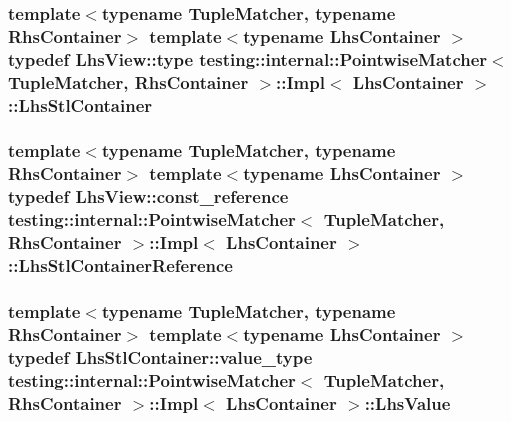 \subsubsection[{\texorpdfstring{Lhs\+Stl\+Container}{LhsStlContainer}}]{\setlength{\rightskip}{0pt plus 5cm}template$<$typename Tuple\+Matcher, typename Rhs\+Container$>$ template$<$typename Lhs\+Container $>$ typedef {\bf Lhs\+View\+::type} {\bf testing\+::internal\+::\+Pointwise\+Matcher}$<$ Tuple\+Matcher, Rhs\+Container $>$\+::{\bf Impl}$<$ Lhs\+Container $>$\+::{\bf Lhs\+Stl\+Container}}\hypertarget{classtesting_1_1internal_1_1PointwiseMatcher_1_1Impl_a23420b57b4cd6d83cec8afda746c27f2}{}\label{classtesting_1_1internal_1_1PointwiseMatcher_1_1Impl_a23420b57b4cd6d83cec8afda746c27f2}
\subsubsection[{\texorpdfstring{Lhs\+Stl\+Container\+Reference}{LhsStlContainerReference}}]{\setlength{\rightskip}{0pt plus 5cm}template$<$typename Tuple\+Matcher, typename Rhs\+Container$>$ template$<$typename Lhs\+Container $>$ typedef {\bf Lhs\+View\+::const\+\_\+reference} {\bf testing\+::internal\+::\+Pointwise\+Matcher}$<$ Tuple\+Matcher, Rhs\+Container $>$\+::{\bf Impl}$<$ Lhs\+Container $>$\+::{\bf Lhs\+Stl\+Container\+Reference}}\hypertarget{classtesting_1_1internal_1_1PointwiseMatcher_1_1Impl_a9df3eb0866f76d59dbdd35fafeb5590c}{}\label{classtesting_1_1internal_1_1PointwiseMatcher_1_1Impl_a9df3eb0866f76d59dbdd35fafeb5590c}
\subsubsection[{\texorpdfstring{Lhs\+Value}{LhsValue}}]{\setlength{\rightskip}{0pt plus 5cm}template$<$typename Tuple\+Matcher, typename Rhs\+Container$>$ template$<$typename Lhs\+Container $>$ typedef Lhs\+Stl\+Container\+::value\+\_\+type {\bf testing\+::internal\+::\+Pointwise\+Matcher}$<$ Tuple\+Matcher, Rhs\+Container $>$\+::{\bf Impl}$<$ Lhs\+Container $>$\+::{\bf Lhs\+Value}}\hypertarget{classtesting_1_1internal_1_1PointwiseMatcher_1_1Impl_a453769e721f4212e399f76c980b4b65c}{}\label{classtesting_1_1internal_1_1PointwiseMatcher_1_1Impl_a453769e721f4212e399f76c980b4b65c}
